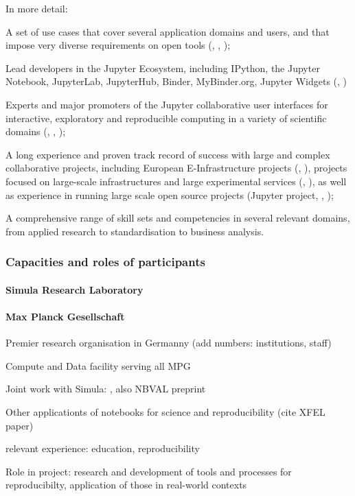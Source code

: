 In more detail: 
\begin{compactitem}
\item A set of use cases that cover several application domains and users, and that impose very diverse
requirements on open tools (, , );
\item Lead developers in the Jupyter Ecosystem, including IPython, the Jupyter Notebook, JupyterLab,
JupyterHub, Binder, MyBinder.org, Jupyter Widgets (, )
\item Experts and major promoters of the Jupyter collaborative user interfaces
  for interactive, exploratory and reproducible computing in a variety of scientific domains (, , );
\item A long experience and proven track record of success with large and complex collaborative projects,
including European E-Infrastructure projects (, ),
projects focused on large-scale infrastructures and large experimental services (, ),
as well as experience in running large scale open source projects (Jupyter project, , );
\item A comprehensive range of skill sets and competencies in several relevant domains,
from applied research to standardisation to business analysis.
\end{compactitem}

\subsubsection{Capacities and roles of participants}

\paragraph{Simula Research Laboratory}


\paragraph{Max Planck Gesellschaft}

\begin{compactitem}
\item Premier research organisation in Germanny (add numbers: institutions,
  staff)
\item Compute and Data facility serving all MPG
\item Joint work with Simula: \cite{Beg2021}, also NBVAL preprint
\item Other applicationts of notebooks for science and reproducibility (cite
  XFEL paper)
\item relevant experience: education, reproducibility
\item Role in project: research and development of tools and processes for
  reproducibilty, application of those in real-world contexts
\end{compactitem}

